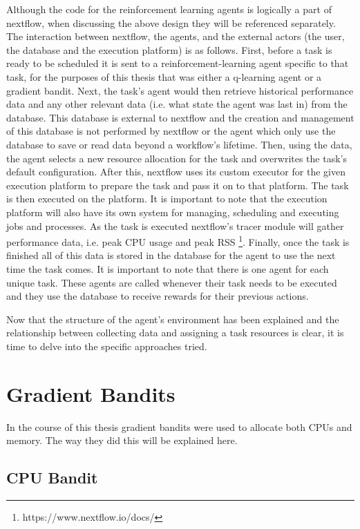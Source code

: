 Although the code for the reinforcement learning agents is logically a part of nextflow, when discussing the above design they will be referenced separately. The interaction between nextflow, the agents, and the external actors (the user, the database and the execution platform) is as follows. First, before a task is ready to be scheduled it is sent to a reinforcement-learning agent specific to that task, for the purposes of this thesis that was either a q-learning agent or a gradient bandit. Next, the task’s agent would then retrieve historical performance data and any other relevant data (i.e. what state the agent was last in) from the database. This database is external to nextflow and the creation and management of this database is not performed by nextflow or the agent which only use the database to save or read data beyond a workflow’s lifetime. Then, using the data, the agent selects a new resource allocation for the task and overwrites the task’s default configuration. After this, nextflow uses its custom executor for the given execution platform to prepare the task and pass it on to that platform. The task is then executed on the platform. It is important to note that the execution platform will also have its own system for managing, scheduling and executing jobs and processes. As the task is executed nextflow’s tracer module will gather performance data, i.e. peak CPU usage and peak RSS \footnote{https://www.nextflow.io/docs/}. Finally, once the task is finished all of this data is stored in the database for the agent to use the next time the task comes. It is important to note that there is one agent for each unique task. These agents are called whenever their task needs to be executed and they use the database to receive rewards for their previous actions.

Now that the structure of the agent’s environment has been explained and the relationship between collecting data and assigning a task resources is clear, it is time to delve into the specific approaches tried.

\section{Gradient Bandits}
\label{sec:gradient_bandits}

In the course of this thesis gradient bandits were used to allocate both CPUs and memory. The way they did this will be explained here.

\subsection{CPU Bandit}
\label{sub:cpu_bandit}

